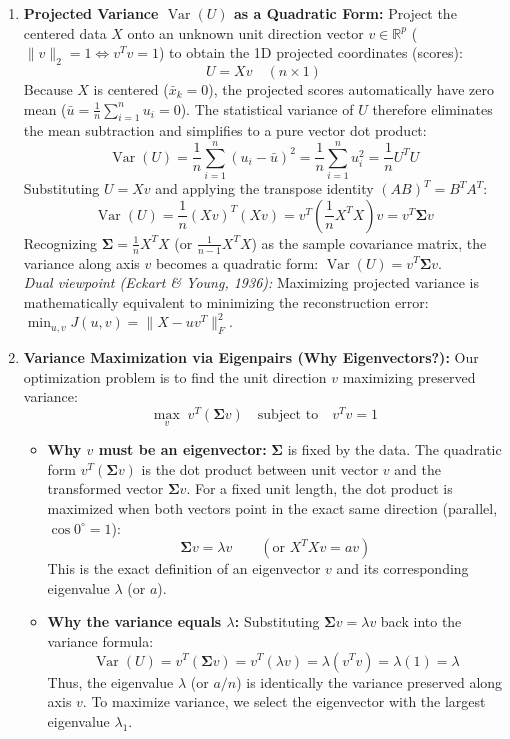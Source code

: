 \documentclass[10pt,a4paper]{article}
\begin{document}
\begin{enumerate}[leftmargin=18pt, itemsep=5pt, topsep=2pt]
    \item \textbf{Projected Variance $\operatorname{Var}(U)$ as a Quadratic Form:}
    Project the centered data $X$ onto an unknown unit direction vector $v \in \mathbb{R}^p$ ($\|v\|_2 = 1 \iff v^T v = 1$) to obtain the 1D projected coordinates (scores):
    \[
    U = X v \quad (n \times 1)
    \]
    Because $X$ is centered ($\bar{x}_k = 0$), the projected scores automatically have zero mean ($\bar{u} = \frac{1}{n}\sum_{i=1}^n u_i = 0$). The statistical variance of $U$ therefore eliminates the mean subtraction and simplifies to a pure vector dot product:
    \[
    \operatorname{Var}(U) = \frac{1}{n} \sum_{i=1}^n (u_i - \bar{u})^2 = \frac{1}{n} \sum_{i=1}^n u_i^2 = \frac{1}{n} U^T U
    \]
    Substituting $U = X v$ and applying the transpose identity $(AB)^T = B^T A^T$:
    \[
    \operatorname{Var}(U) = \frac{1}{n} (X v)^T (X v) = v^T \left(\frac{1}{n} X^T X\right) v = v^T \mathbf{\Sigma} v
    \]
    Recognizing $\mathbf{\Sigma} = \frac{1}{n} X^T X$ (or $\frac{1}{n-1} X^T X$) as the sample covariance matrix, the variance along axis $v$ becomes a quadratic form: $\operatorname{Var}(U) = v^T \mathbf{\Sigma} v$.\\[3pt]
    \textit{Dual viewpoint (Eckart \& Young, 1936):} Maximizing projected variance is mathematically equivalent to minimizing the reconstruction error: $\min_{u, v} J(u, v) = \|X - u v^T\|_F^2$.

    \item \textbf{Variance Maximization via Eigenpairs (Why Eigenvectors?):}
    Our optimization problem is to find the unit direction $v$ maximizing preserved variance:
    \[
    \max_{v} \; v^T (\mathbf{\Sigma} v) \quad \text{subject to} \quad v^T v = 1
    \]
    \begin{itemize}[leftmargin=12pt, itemsep=2pt]
        \item \textbf{Why $v$ must be an eigenvector:} $\mathbf{\Sigma}$ is fixed by the data. The quadratic form $v^T (\mathbf{\Sigma} v)$ is the dot product between unit vector $v$ and the transformed vector $\mathbf{\Sigma} v$. For a fixed unit length, the dot product is maximized when both vectors point in the exact same direction (parallel, $\cos 0^\circ = 1$):
        \[
        \mathbf{\Sigma} v = \lambda v \qquad (\text{or } X^T X v = a v)
        \]
        This is the exact definition of an eigenvector $v$ and its corresponding eigenvalue $\lambda$ (or $a$).
        \item \textbf{Why the variance equals $\lambda$:} Substituting $\mathbf{\Sigma} v = \lambda v$ back into the variance formula:
        \[
        \operatorname{Var}(U) = v^T (\mathbf{\Sigma} v) = v^T (\lambda v) = \lambda (v^T v) = \lambda(1) = \lambda
        \]
        Thus, the eigenvalue $\lambda$ (or $a/n$) is identically the variance preserved along axis $v$. To maximize variance, we select the eigenvector with the largest eigenvalue $\lambda_1$.
    \end{itemize}


\end{enumerate}
\end{document}
